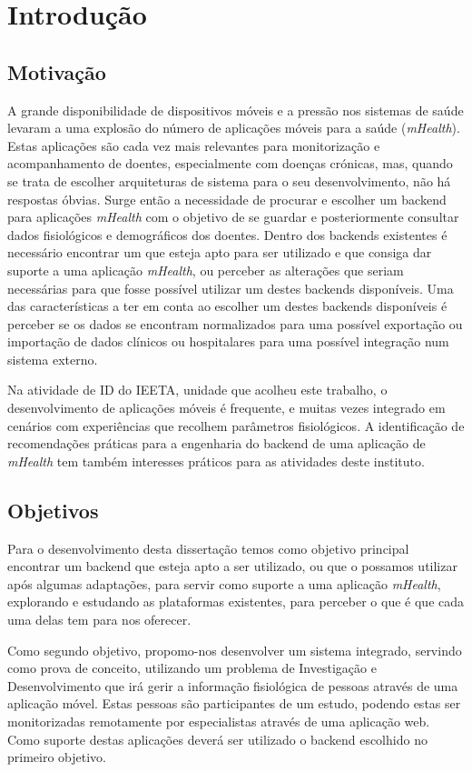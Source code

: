\chapter{Introdu\c c\~ao}

\section{Motivação}

A grande disponibilidade de dispositivos móveis e a pressão nos sistemas de saúde levaram a uma explosão do número de aplicações móveis para a saúde (\textit{mHealth}). Estas aplicações são cada vez mais relevantes para monitorização e acompanhamento de doentes, especialmente com doenças crónicas, mas, quando se trata de escolher arquiteturas de sistema para o seu desenvolvimento, não há respostas óbvias. Surge então a necessidade de procurar e escolher um backend para aplicações \textit{mHealth} com o objetivo de se guardar e posteriormente consultar dados fisiológicos e demográficos dos doentes.
Dentro dos backends existentes é necessário encontrar um que esteja apto para ser utilizado e que consiga dar suporte a uma aplicação \textit{mHealth}, ou perceber as alterações que seriam necessárias para que fosse possível utilizar um destes backends disponíveis. Uma das características a ter em conta ao escolher um destes backends disponíveis é perceber se os dados se encontram normalizados para uma possível exportação ou importação de dados clínicos ou hospitalares para uma possível integração num sistema externo. \par
Na atividade de \gls{ID} do \gls{IEETA}, unidade que acolheu este trabalho, o desenvolvimento de aplicações móveis é frequente, e muitas vezes integrado em cenários com experiências que recolhem parâmetros fisiológicos. A identificação de recomendações práticas para a engenharia do backend de uma aplicação de \textit{mHealth} tem também interesses práticos para as atividades deste instituto.

\section{Objetivos}
Para o desenvolvimento desta dissertação temos como objetivo principal encontrar um backend que esteja apto a ser utilizado, ou que o possamos utilizar após algumas adaptações, para servir como suporte a uma aplicação \textit{mHealth}, explorando e estudando as plataformas existentes, para perceber o que é que cada uma delas tem para nos oferecer. \par
Como segundo objetivo, propomo-nos desenvolver um sistema integrado, servindo como prova de conceito, utilizando um problema de Investigação e Desenvolvimento que irá gerir a informação fisiológica de pessoas através de uma aplicação móvel. Estas pessoas são participantes de um estudo, podendo estas ser monitorizadas remotamente por especialistas através de uma aplicação web. Como suporte destas aplicações deverá ser utilizado o backend escolhido no primeiro objetivo.
\cleardoublepage